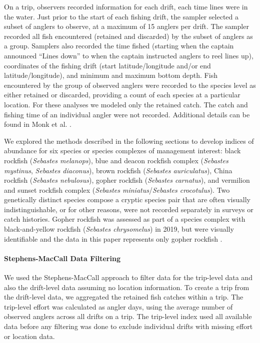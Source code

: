 \documentclass[
  authoryear,
  preprint,
  3p]{elsarticle}
\let\oldparagraph\paragraph
\renewcommand{\paragraph}[1]{\oldparagraph{#1}\mbox{}}
\begin{document}
On a trip, observers recorded information for each drift, each time
lines were in the water. Just prior to the start of each fishing drift,
the sampler selected a subset of anglers to observe, at a maximum of 15
anglers per drift. The sampler recorded all fish encountered (retained
and discarded) by the subset of anglers as a group. Samplers also
recorded the time fished (starting when the captain announced ``Lines
down'' to when the captain instructed anglers to reel lines up),
coordinates of the fishing drift (start latitude/longitude and/or end
latitude/longitude), and minimum and maximum bottom depth. Fish
encountered by the group of observed anglers were recorded to the
species level as either retained or discarded, providing a count of each
species at a particular location. For these analyses we modeled only the
retained catch. The catch and fishing time of an individual angler were
not recorded. Additional details can be found in Monk et al.
\citeyearpar{Monk:2014:DRD}.

We explored the methods described in the following sections to develop
indices of abundance for six species or species complexes of management
interest: black rockfish (\emph{Sebastes melanops}), blue and deacon
rockfish complex (\emph{Sebastes mystinus}, \emph{Sebastes diaconus}),
brown rockfish (\emph{Sebastes auriculatus}), China rockfish
(\emph{Sebastes nebulosus}), gopher rockfish (\emph{Sebastes carnatus}),
and vermilion and sunset rockfish complex (\emph{Sebastes
miniatus}/\emph{Sebastes crocotulus}). Two genetically distinct species
compose a cryptic species pair that are often visually
indistinguishable, or for other reasons, were not recorded separately in
surveys or catch histories. Gopher rockfish was assessed as part of a
species complex with black-and-yellow rockfish (\emph{Sebastes
chrysomelus}) in 2019, but were visually identifiable and the data in
this paper represents only gopher rockfish \citep{Monk:2019:CSG}.

\hypertarget{stephens-maccall-data-filtering}{%
\paragraph{Stephens-MacCall Data
Filtering}\label{stephens-maccall-data-filtering}}

We used the Stephens-MacCall approach to filter data for the trip-level
data and also the drift-level data assuming no location information. To
create a trip from the drift-level data, we aggregated the retained fish
catches within a trip. The trip-level effort was calculated as angler
days, using the average number of observed anglers across all drifts on
a trip. The trip-level index used all available data before any
filtering was done to exclude individual drifts with missing effort or
location data.
\end{document}
